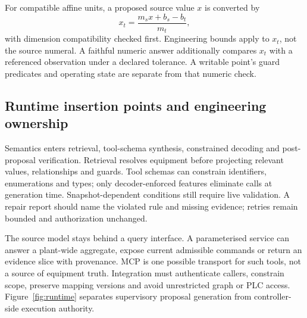 For compatible affine units, a proposed source value $x$ is converted by
\begin{equation}
 x_t=\frac{m_sx+b_s-b_t}{m_t},
\end{equation}
with dimension compatibility checked first. Engineering bounds apply to $x_t$,
not the source numeral. A faithful numeric answer additionally compares $x_t$
with a referenced observation under a declared tolerance. A writable point's
guard predicates and operating state are separate from that numeric check.

\subsection{Runtime insertion points and engineering ownership}
Semantics enters retrieval, tool-schema synthesis, constrained decoding and
post-proposal verification. Retrieval resolves equipment before projecting
relevant values, relationships and guards. Tool schemas can constrain identifiers,
enumerations and types; only decoder-enforced features eliminate calls at
generation time. Snapshot-dependent conditions still require live validation.
A repair report should name the violated rule and missing evidence; retries
remain bounded and authorization unchanged.

The source model stays behind a query interface. A parameterised service can
answer a plant-wide aggregate, expose current admissible commands or return
an evidence slice with provenance. MCP is one possible transport for such tools,
not a source of equipment truth. Integration must authenticate callers, constrain
scope, preserve mapping versions and avoid unrestricted graph or PLC access.
Figure~\ref{fig:runtime} separates supervisory proposal generation from
controller-side execution authority.

